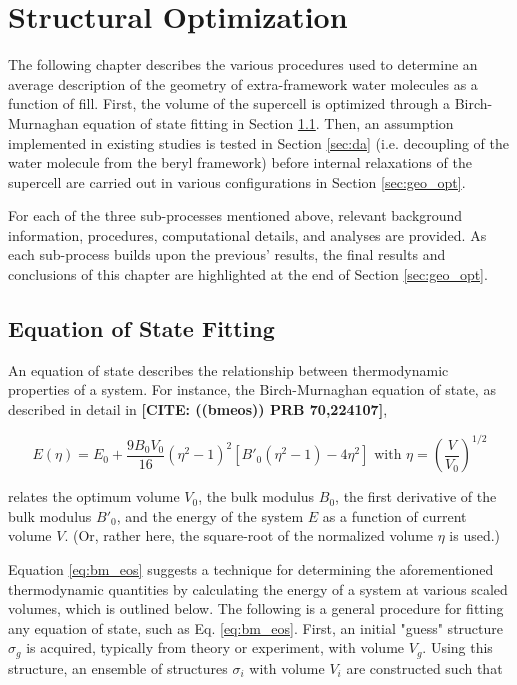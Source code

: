 \chapter{Structural Optimization}
\label{ch:struct_opt}

    
    The following chapter describes the various procedures used to determine an average description of the geometry of extra-framework water molecules as a function of fill. First, the volume of the supercell is optimized through a Birch-Murnaghan equation of state fitting in Section \ref{sec:eos}. Then, an assumption implemented in existing studies is tested in Section \ref{sec:da} (i.e. decoupling of the water molecule from the beryl framework) before internal relaxations of the supercell are carried out in various configurations in Section \ref{sec:geo_opt}.
    
    For each of the three sub-processes mentioned above, relevant background information, procedures, computational details, and analyses are provided. As each sub-process builds upon the previous' results, the final results and conclusions of this chapter are highlighted at the end of Section \ref{sec:geo_opt}.
    
    \section{Equation of State Fitting}
    \label{sec:eos}
        
            An equation of state describes the relationship between thermodynamic properties of a system. For instance, the Birch-Murnaghan equation of state, as described in detail in \textbf{[CITE: ((bmeos)) PRB 70,224107]},
            
            \begin{equation}
            \label{eq:bm_eos}
                E(\eta) = E_0 + \frac{9B_0V_0}{16}\left(\eta^2 -1\right)^2\left[ B'_0 \left(\eta^2-1\right) -4\eta^2\right] \text{ with } \eta = \left(\frac{V}{V_0}\right)^{1/2}
            \end{equation}
            
            \noindent relates the optimum volume $V_0$, the bulk modulus $B_0$, the first derivative of the bulk modulus $B'_0$, and the energy of the system $E$ as a function of current volume $V$. (Or, rather here, the square-root of the normalized volume $\eta$ is used.)
            
            Equation \ref{eq:bm_eos} suggests a technique for determining the aforementioned thermodynamic quantities by calculating the energy of a system at various scaled volumes, which is outlined below.
         The following is a general procedure for fitting any equation of state, such as Eq. \ref{eq:bm_eos}. First, an initial "guess" structure $\sigma_g$ is acquired, typically from theory or experiment, with volume $V_g$. Using this structure, an ensemble of structures $\sigma_i$ with volume $V_i$ are constructed such that
        
